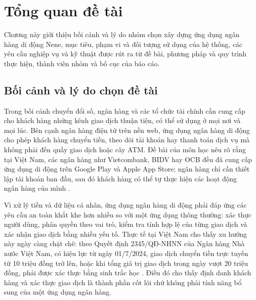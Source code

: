 \chapter{Tổng quan đề tài}
\label{chap:1}

Chương này giới thiệu bối cảnh và lý do nhóm chọn xây dựng ứng dụng ngân hàng di động Nene, mục tiêu, phạm vi và đối tượng sử dụng của hệ thống, các yêu cầu nghiệp vụ và kỹ thuật được rút ra từ đề bài, phương pháp và quy trình thực hiện, thành viên nhóm và bố cục của báo cáo.

\section{Bối cảnh và lý do chọn đề tài}
\label{sec:ch1-boi-canh}

Trong bối cảnh chuyển đổi số, ngân hàng và các tổ chức tài chính cần cung cấp cho khách hàng những kênh giao dịch thuận tiện, có thể sử dụng ở mọi nơi và mọi lúc. Bên cạnh ngân hàng điện tử trên nền web, ứng dụng ngân hàng di động cho phép khách hàng chuyển tiền, theo dõi tài khoản hay thanh toán dịch vụ mà không phải đến quầy giao dịch hoặc cây ATM. Đề bài của môn học nêu rõ rằng tại Việt Nam, các ngân hàng như Vietcombank, BIDV hay OCB đều đã cung cấp ứng dụng di động trên Google Play và Apple App Store; ngân hàng chỉ cần thiết lập tài khoản ban đầu, sau đó khách hàng có thể tự thực hiện các hoạt động ngân hàng của mình \parencite{ch1-debai}.

Vì xử lý tiền và dữ liệu cá nhân, ứng dụng ngân hàng di động phải đáp ứng các yêu cầu an toàn khắt khe hơn nhiều so với một ứng dụng thông thường: xác thực người dùng, phân quyền theo vai trò, kiểm tra tính hợp lệ của từng giao dịch và xác nhận giao dịch bằng nhiều yếu tố. Thực tế tại Việt Nam cho thấy xu hướng này ngày càng chặt chẽ: theo Quyết định 2345/QĐ-NHNN của Ngân hàng Nhà nước Việt Nam, có hiệu lực từ ngày 01/7/2024, giao dịch chuyển tiền trực tuyến từ 10 triệu đồng trở lên, hoặc khi tổng giá trị giao dịch trong ngày vượt 20 triệu đồng, phải được xác thực bằng sinh trắc học \parencite{ch5-sbv2345}. Điều đó cho thấy định danh khách hàng và xác thực giao dịch là thành phần cốt lõi chứ không phải tính năng bổ sung của một ứng dụng ngân hàng.


